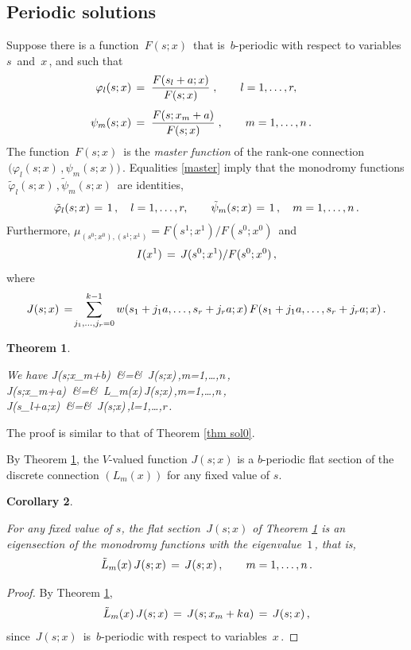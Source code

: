 \documentclass[12pt]{amsart}
\def\>{\relax\ifmmode\mskip.666667\thinmuskip\relax\else\kern.111111em\fi}
\def\<{\relax\ifmmode\mskip-.333333\thinmuskip\relax\else\kern-.0555556em\fi}
\def\vsk#1>{\vskip#1\baselineskip}
\def\vv#1>{\vadjust{\vsk#1>}\ignorespaces}
\def\vvn#1>{\vadjust{\nobreak\vsk#1>\nobreak}\ignorespaces}
\newtheorem{thm}{Theorem}[section]
\newtheorem{cor}[thm]{Corollary}
\theoremstyle{definition} %
\numberwithin{equation}{section}
\theoremstyle{definition}
\let\phi\varphi
\def\beq{\begin{equation}}
\def\eeq{\end{equation}}
\def\be{\begin{equation*}}
\def\ee{\end{equation*}}
\begin{document}
\subsection{Periodic solutions}
\label{sec period}
Suppose there is a function \,$F(s;x)$ \,that is \,$b$-periodic with respect
to variables \,$s$ \,and \,$x$\,, and such that
\begin{align}
\notag
\\[-16pt]
\label{master}
\phi_l(s;x)\,&{}=\;\frac{F(s_l+a;x)}{F(s;x)}\;,\qquad l=1,\dots,r,
\\[4pt]
\notag
\psi_m(s;x)\,&{}=\;\frac{F(s;x_m+a)}{F(s;x)}\;,\qquad m=1,\dots,n\,.
\end{align}
The function \,$F(s;x)$ \,is the {\it master function\/} of the rank-one
connection
\\
 \,$\bigl(\phi_l(s;x)\,,\psi_m(s;x)\bigr)$\,.
Equalities \eqref{master} imply that the monodromy functions
\,$\tilde\phi_l(s;x)\,,\tilde\psi_m(s;x)$ \,are identities,
\vvn.4>
\be
\tilde\phi_l(s;x)\>=\>1\,,\quad l=1,\dots,r,\qquad
\tilde\psi_m(s;x)\>=\>1\,,\quad m=1,\dots,n\,.
\vv.4>
\ee
Furthermore, \;$\mu_{(s^0; x^0),(s^1; x^1)}=F(s^1;x^1)/F(s^0;x^0)$ \,and
\vvn.4>
\be
I(x^1)\,=\,J(s^0;x^1)/F(s^0;x^0)\,,
\vv-.5>
\ee
where
\vvn-.5>
\be
J(s;x)\,=\!\sum_{j_1, \dots, j_r=0}^{k-1}
w(s_1+j_1a, \dots, s_r+j_ra; x)\,F(s_1 + j_1a,\dots, s_r + j_ra; x)\,.
\vv.2>
\ee

\begin{thm}
\label{thm solJ}

We have 
\bean
\label{ilib}
J(s;x_m+b)\,
&=&
\,J(s;x)\,,\qquad m=1,\dots,n\,,
\\
\label{iliJ}
J(s;x_m+a)\,
&=&
\,L_m(x)\,J(s;x)\,,\qquad m=1,\dots,n\,,
\\
\label{ILIJ}
J(s_l+a;x)\,
&=& \,J(s;x)\,,\qquad l=1,\dots,r\,.
\eean

\end{thm}

The proof is similar to that of Theorem \ref{thm sol0}.
\smallskip

By Theorem \ref{thm solJ}, the $V$-valued function $J(s;x)$ is a $b$-periodic flat section of the discrete connection
 $(L_m(x))$ for any fixed value of $s$.


\begin{cor}
\label{thm i solJ}

For any fixed value of $s$, the  flat section \,$J(s;x)$ of Theorem \ref{thm solJ} is an eigensection
of the monodromy functions with the eigenvalue \,$1$\,, that is,
\vvn.4>
\beq
\label{e soJ}
\tilde L_m(x)\,J(s;x)\,=\,J(s;x)\,,\qquad m=1,\dots,n\,.
\vv.2>
\eeq
\end{cor}
\begin{proof}
By Theorem \ref{thm solJ},
\vvn.3>
\be
\tilde L_m(x)\,J(s;x)\,=\,J(s;x_m+k\<\>a)\,=\,J(s;x)\,,
\vv.3>
\ee
since \,$J(s;x)$ \,is \,$b$-periodic with respect to variables \,$x$\,.
\end{proof}
\end{document}
